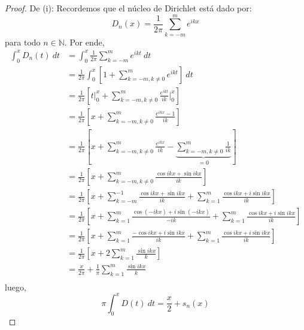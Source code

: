 \documentclass[12pt]{report}
\theoremstyle{largebreak}
\begin{document}
    \begin{proof}
        De (i): Recordemos que el núcleo de Dirichlet está dado por:
        \begin{equation*}
            D_n(x)=\frac{1}{2\pi}\sum_{ k=-m}^m e^{ ikx}
        \end{equation*}
        para todo $n\in\mathbb{N}$. Por ende,
        \begin{equation*}
            \begin{split}
                \int_0^x D_n(t)\:dt&=\int_0^x \frac{1}{2\pi}\sum_{ k=-m}^m e^{ ikt}\:dt\\
                &=\frac{1}{2\pi}\int_0^x \left[1+\sum_{ k=-m,k\neq0}^m e^{ ikt}\right] \:dt\\
                &=\frac{1}{2\pi}\left[t\Big|_0^x+\sum_{ k=-m,k\neq0}^m \frac{e^{ ikt}}{ik}\Big|_0^{x} \right]\\
                &=\frac{1}{2\pi}\left[x+\sum_{ k=-m,k\neq0}^m \frac{e^{ ikx}-1}{ik} \right]\\
                &=\frac{1}{2\pi}\left[x+\sum_{ k=-m,k\neq0}^m \frac{e^{ ikx}}{ik}-\underbrace{\sum_{ k=-m,k\neq0}^m \frac{1}{ik}}_{=0} \right]\\
                &=\frac{1}{2\pi}\left[x+\sum_{ k=-m,k\neq0}^m \frac{\cos ikx+\sin ikx}{ik}\right]\\
                &=\frac{1}{2\pi}\left[x+\sum_{ k=-m}^{-1} \frac{\cos ikx+\sin ikx}{ik}+\sum_{ k=1}^m \frac{\cos ikx+i\sin ikx}{ik}\right]\\
                &=\frac{1}{2\pi}\left[x+\sum_{ k=1}^m \frac{\cos (-ikx)+i\sin (-ikx)}{-ik}+\sum_{ k=1}^m \frac{\cos ikx+i\sin ikx}{ik}\right]\\
                &=\frac{1}{2\pi}\left[x+\sum_{ k=1}^m \frac{-\cos ikx+i\sin ikx}{ik}+\sum_{ k=1}^m \frac{\cos ikx+i\sin ikx}{ik}\right]\\
                &=\frac{1}{2\pi}\left[x+2\sum_{ k=1}^m \frac{\sin ikx}{k}\right]\\
                &=\frac{x}{2\pi}+\frac{1}{\pi}\sum_{ k=1}^m \frac{\sin ikx}{k}\\
            \end{split}
        \end{equation*}
        luego,
        \begin{equation*}
            \pi\int_0^x D(t)\:dt=\frac{x}{2}+s_n(x)
        \end{equation*}


\end{proof}
\end{document}
